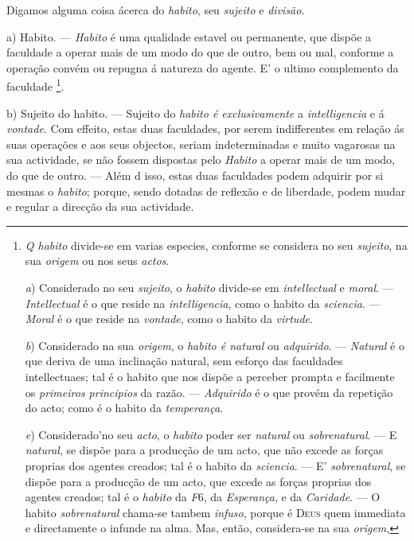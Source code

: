 Digamos alguma coisa ácerca do \emph{habito}, seu \emph{sujeito} e \emph{divisão}.

a) Habito. --- \emph{Habito} é uma qualidade estavel ou permanente, que dispõe a faculdade a operar mais de um modo do que de outro, bem ou mal, conforme a operação convém ou repugna á natureza do agente. E' o ultimo complemento da faculdade \footnote{\emph{Q habito} divide-se em varias especies, conforme se considera no seu \emph{sujeito}, na sua \emph{origem} ou nos seus \emph{actos}.\par \emph{a}) Considerado no seu \emph{sujeito}, o \emph{habito} divide-se em \emph{intellectual} e \emph{moral}. --- \emph{Intellectual} é o que reside na \emph{intelligencia}, como o habito da \emph{sciencia}. --- \emph{Moral} é o que reside na \emph{vontade}, como o habito da \emph{virtude}.\par \emph{b}) Considerado na sua \emph{origem}, o \emph{habito é natural} ou \emph{adquirido}. --- \emph{Natural} é o que deriva de uma inclinação natural, sem esforço das faculdades intellectuaes; tal é o habito que nos dispõe a perceber prompta e facilmente os \emph{primeiros principios} da razão. --- \emph{Adquirido} é o que provém da repetição do acto; como é o habito da \emph{temperança}.\par \emph{e}) Considerado'no seu \emph{acto}, o \emph{habito} poder ser \emph{natural} ou \emph{sobrenatural}. --- E \emph{natural}, se dispõe para a producção de um acto, que não excede as forças proprias dos agentes creados; tal é o habito da \emph{sciencia}. --- E' \emph{sobrenatural}, se dispõe para a producção de um acto, que excede as forças proprias dos agentes creados; tal é o \emph{habito} da \emph{F}6, da \emph{Esperança}, e da \emph{Caridade}. --- O habito \emph{sobrenatural} chama-se tambem \emph{infuso}, porque é \textsc{Deus} quem immediata e directamente o infunde na alma. Mas, então, considera-se na sua \emph{origem},}.

b) Sujeito do habito. --- Sujeito do \emph{habito é exclusivamente} a \emph{intelligencia} e á \emph{vontade}. Com effeito, estas duas faculdades, por serem indifferentes em relação ás suas operações e aos seus objectos, seriam indeterminadas e muito vagarosas na sua actividade, se não fossem dispostas pelo \emph{Habito} a operar mais de um modo, do que de outro. --- Além d isso, estas duas faculdades podem adquirir por si mesmas o \emph{habito}; porque, sendo dotadas de reflexão e de liberdade, podem mudar e regular a direcção da sua actividade.

